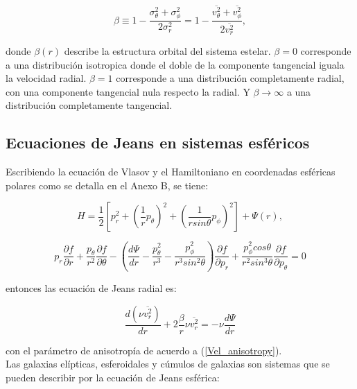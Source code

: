 \begin{equation}
\label{Vel_anisotropy}
\beta \equiv 1- \frac{\sigma_\theta^2 + \sigma_\phi^2}{2 \sigma_r^2} = 1- \frac{\overline{v_\theta^2} + \overline{v_\phi^2}}{2 \overline{v_r^2}}, 
\end{equation}

donde $\beta (r)$ describe la estructura orbital del sistema estelar. $\beta = 0$ corresponde a una distribución isotropica donde el doble de la componente tangencial iguala la velocidad radial. $\beta = 1$ corresponde a una distribución completamente radial, con una componente tangencial nula respecto la radial. Y $\beta \rightarrow \infty$ a una distribución completamente tangencial.

\subsection{Ecuaciones de Jeans en sistemas esféricos}

Escribiendo la ecuación de Vlasov y el Hamiltoniano en coordenadas esféricas polares como se detalla en el Anexo B, se tiene:

\begin{equation}
H = \frac{1}{2} \left [ p_r^2 + \left ( \frac{1}{r} p_\theta  \right )^2 + \left ( \frac{1}{r sin \theta} p_\phi  \right )^2 \right ] + \Psi (r),
\end{equation}

\begin{equation}
p_r \frac{\partial f}{\partial r} + \frac{p_\theta}{r^2} \frac{\partial f}{\partial \theta} - \left ( \frac{d \Psi}{d r}  - \frac{p_\theta^2}{r^3} - \frac{p_\phi^2}{r^3 sin^2\theta} \right ) \frac{\partial f}{\partial p_r} + \frac{p_\phi^2 cos \theta}{r^2 sin^3\theta} \frac{\partial f}{\partial p_\theta} = 0
\end{equation}

entonces las ecuación de Jeans radial es:

\begin{equation}
\frac{d (\nu \overline{v_r^2})}{dr}  + 2 \frac{\beta}{r} \nu \overline{v_r^2} = - \nu \frac{d \Psi}{d r}
\end{equation}

con el parámetro de anisotropía de acuerdo a (\ref{Vel_anisotropy}).\\

Las galaxias elípticas, esferoidales y cúmulos de galaxias son sistemas que se pueden describir por la ecuación de Jeans esférica:

